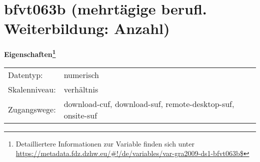 
    \setcounter{footnote}{0}

    \vspace*{-1.8cm}
	\section{bfvt063b (mehrtägige berufl. Weiterbildung: Anzahl)}
	\label{section:bfvt063b}



    \vspace*{0.5cm}
    \noindent\textbf{Eigenschaften\footnote{Detailliertere Informationen zur Variable finden sich unter
		\url{https://metadata.fdz.dzhw.eu/\#!/de/variables/var-gra2009-ds1-bfvt063b$}}}\\
	\begin{tabularx}{\hsize}{@{}lX}
	Datentyp: & numerisch \\
	Skalenniveau: & verhältnis \\
	Zugangswege: &
	  download-cuf, 
	  download-suf, 
	  remote-desktop-suf, 
	  onsite-suf
 \\
    \end{tabularx}



